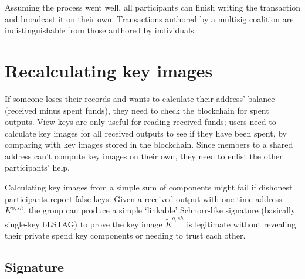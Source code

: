Assuming the process went well, all participants can finish writing the transaction and broadcast it on their own. Transactions authored by a multisig coalition are indistinguishable from those authored by individuals.



\section{Recalculating key images}
\label{sec:recalculating-key-images-multisig}

If someone loses their records and wants to calculate their address' balance (received minus spent funds), they need to check the blockchain for spent outputs. View keys are only useful for reading received funds; users need to calculate key images for all received outputs to see if they have been spent, by comparing with key images stored in the blockchain. Since members to a shared address can't compute key images on their own, they need to enlist the other participants' help.

Calculating key images from a simple sum of components might fail if dishonest participants report false keys. Given a received output with one-time address $K^{o,sh}$, the group can produce a simple `linkable' Schnorr-like signature (basically single-key bLSTAG) to prove the key image $\tilde{K}^{o,sh}$ is legitimate without revealing their private spend key components or needing to trust each other. 

\subsection*{Signature}

